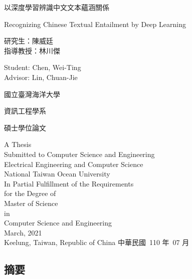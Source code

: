 \documentclass[12pt]{article}
\makeatletter
\newif\if@mainmatter \@mainmattertrue
\newcommand\frontmatter{%
    \cleardoublepage
  \@mainmatterfalse
  \pagenumbering{roman}}
\makeatother
\begin{document}
\begin{CJK*}{UTF8}{bkai}
\begin{titlepage}
  \centering
  {\LARGE 以深度學習辨識中文文本蘊涵關係\par}
  \vfill
  {\Large Recognizing Chinese Textual Entailment by Deep Learning\par}
  \vfill
  {
    \Large
    \begin{minipage}{2in}
      研究生：陳威廷 \\
      指導教授：林川傑
    \end{minipage}
    \hfill
    \begin{minipage}{2.4in}
      Student: Chen, Wei-Ting \\
      Advisor: Lin, Chuan-Jie
    \end{minipage}
    \par
  }
  \vfill
  {\LARGE 國立臺灣海洋大學\par}
  {\LARGE 資訊工程學系\par}
  {\LARGE 碩士學位論文\par}
  \vfill
  {
    \LARGE
    A Thesis \\
    Submitted to Computer Science and Engineering \\
    Electrical Engineering and Computer Science \\
    National Taiwan Ocean University \\
    In Partial Fulfillment of the Requirements \\
    for the Degree of \\
    Master of Science \\
    in \\
    Computer Science and Engineering \\
    March, 2021 \\ \vspace{0.5cm}
    Keelung, Taiwan, Republic of China
  }
  \vfill
  {\LARGE 中華民國\ 110 年\ 07 月}
\end{titlepage}
\ClearWallPaper
{}
\newpage

\begin{spacing}{1.77}

\frontmatter
{}
{}
\section*{摘要}

\end{spacing}
\end{CJK*}
\end{document}
